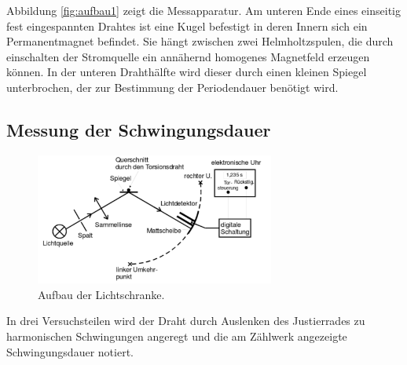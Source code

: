 Abbildung \ref{fig:aufbau1} zeigt die Messapparatur. 
Am unteren Ende eines einseitig fest eingespannten Drahtes ist eine Kugel befestigt in deren Innern sich ein Permanentmagnet befindet. Sie hängt zwischen zwei Helmholtzspulen, die durch einschalten der Stromquelle ein annähernd homogenes Magnetfeld erzeugen können.
In der unteren Drahthälfte wird dieser durch einen kleinen Spiegel unterbrochen, der zur Bestimmung der Periodendauer benötigt wird.
\subsection{Messung der Schwingungsdauer}
\label{sec:durchfuehrung2}
\begin{figure}
	\centering
	\includegraphics[width=0.7\textwidth]{Bilder/Aufbau2.pdf}
	\caption{Aufbau der Lichtschranke. \cite{V102}}
	\label{fig:aufbau2}
\end{figure}

In drei Versuchsteilen wird der Draht durch Auslenken des Justierrades zu harmonischen Schwingungen angeregt und die am Zählwerk angezeigte Schwingungsdauer notiert.

